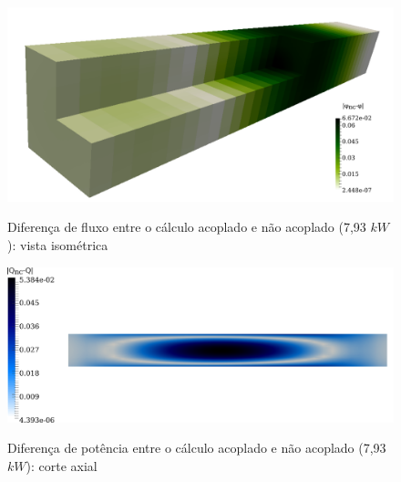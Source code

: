 \begin{figure}[htb]
  \caption{Diferença de fluxo entre o cálculo acoplado e não acoplado (7,93 $kW$): vista isométrica}
  \centering\includegraphics[scale=0.6]{figuras/diff-flux-isometrico.png}
  \label{fig:f3}
\end{figure}

\begin{figure}[htb]
  \caption{Diferença de potência entre o cálculo acoplado e não acoplado (7,93 $kW$): corte axial}
  \centering\includegraphics[scale=0.6]{figuras/diff-q-axial.png}
  \label{fig:q1}
\end{figure}

